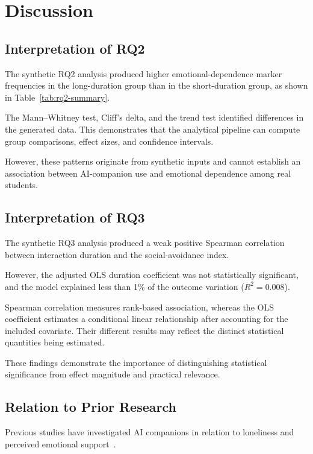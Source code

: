 
\section{Discussion}
\label{sec:discussion}

\subsection{Interpretation of RQ2}
\label{subsec:discussion-rq2}

The synthetic RQ2 analysis produced higher
emotional-dependence marker frequencies in the
long-duration group than in the short-duration group,
as shown in Table~\ref{tab:rq2-summary}.

The Mann--Whitney test, Cliff's delta, and the
trend test identified differences in the generated
data. This demonstrates that the analytical pipeline
can compute group comparisons, effect sizes, and
confidence intervals.

However, these patterns originate from synthetic
inputs and cannot establish an association between
AI-companion use and emotional dependence among
real students.

\subsection{Interpretation of RQ3}
\label{subsec:discussion-rq3}

The synthetic RQ3 analysis produced a weak positive
Spearman correlation between interaction duration
and the social-avoidance index.

However, the adjusted OLS duration coefficient was
not statistically significant, and the model explained
less than 1\% of the outcome variation
($R^2=0.008$).

Spearman correlation measures rank-based association,
whereas the OLS coefficient estimates a conditional
linear relationship after accounting for the included
covariate. Their different results may reflect the
distinct statistical quantities being estimated.

These findings demonstrate the importance of
distinguishing statistical significance from
effect magnitude and practical relevance.

\subsection{Relation to Prior Research}
\label{subsec:prior-research}

Previous studies have investigated AI companions
in relation to loneliness and perceived emotional
support~\cite{defreitasAICompanionsReduce2024,
maplesLonelinessSuicideMitigation2024}.

